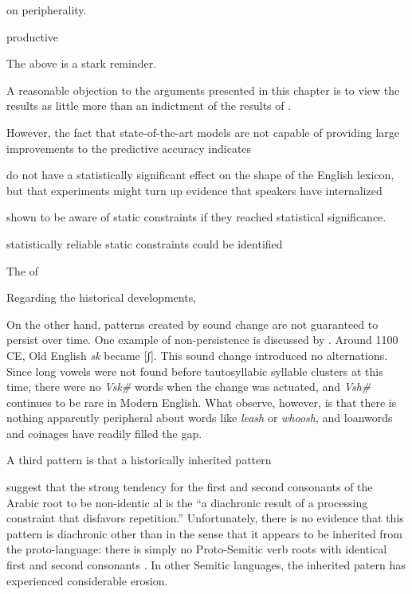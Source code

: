 
\citet{Borowsky1989} on peripherality.

productive \citet{Duanmu2008}

The above is a stark reminder.


A reasonable objection to the arguments presented in this chapter is to view the results as little more than an indictment of the results of \citealt{Pierrehumbert1994}.

However, the fact that state-of-the-art models are not capable of providing large improvements to the predictive accuracy indicates


 do not have a statistically significant effect on the shape of the English lexicon, but that experiments might turn up evidence that speakers have internalized 


shown to be aware of static constraints if they reached statistical significance. 



 statistically reliable static constraints could be identified 

The of



Regarding the historical developments,

\citet{Martin2007}

On the other hand, patterns created by sound change are not guaranteed to persist over time. 
One example of non-persistence is discussed by \citet{Iverson2005}.  
Around 1100 CE, Old English \emph{sk} became [ʃ]. 
This sound change introduced no alternations.
Since long vowels were not found before tautosyllabic syllable clusters at this time, there were no \emph{V\lm sk\#} words when the
 change was actuated, and \emph{V\lm sh\#} continues to be rare in Modern English. 
What \citeauthor{Iverson2005} observe, however, is that there is nothing apparently peripheral about words like \emph{leash} or \emph{whoosh}, and loanwords and coinages have readily filled the gap.

A third pattern is that a historically inherited pattern

\citet[][140]{Frisch2004} suggest that the strong tendency for the first and second consonants of the Arabic root to be non-identic
al is the ``a diachronic result of a processing constraint that disfavors repetition.'' 
Unfortunately, there is no evidence that this pattern is diachronic other than in the sense that it appears to be inherited from the proto-language: there is simply no Proto-Semitic verb roots with identical first and second consonants \citep[][178]{Greenberg1950}. 
In other Semitic languages, the inherited patern has experienced considerable erosion. 

